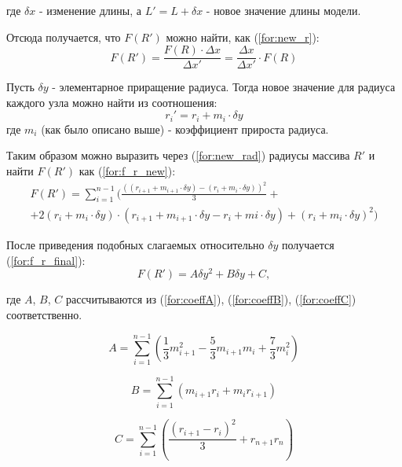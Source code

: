 где $\delta x$ - изменение длины, а $L' = L + \delta x$ - новое значение длины модели.

Отсюда получается, что $F(R')$ можно найти, как (\ref{for:new_r}):
\begin{equation}
    \label{for:new_r}
    F(R') = \frac{F(R) \cdot \Delta x}{\Delta x'} = \frac{\Delta x}{\Delta x'} \cdot F(R)
\end{equation}

Пусть $\delta y$ - элементарное приращение радиуса. Тогда новое значение для радиуса каждого узла можно найти из соотношения:
\begin{equation}
    \label{for:new_rad}
    r_i' = r_i + m_i \cdot \delta y
\end{equation}
где $m_i$ (как было описано выше) - коэффициент прироста радиуса.

Таким образом можно выразить через (\ref{for:new_rad}) радиусы массива $R'$ и найти $F(R')$ как (\ref{for:f_r_new}):
\begin{equation}
    \label{for:f_r_new}
    \begin{split}
        F(R') = \sum_{i=1}^{n-1} (\frac{((r_{i + 1} + m_{i + 1} \cdot \delta y) - (r_i + m_{i} \cdot \delta y))^2}{3} + \\
        + 2 (r_i + m_i \cdot \delta y) \cdot (r_{i + 1} + m_{i + 1} \cdot \delta y - r_i + m{i} \cdot \delta y) + (r_i + m_i \cdot \delta y)^2)
    \end{split}
\end{equation}

После приведения подобных слагаемых относительно $\delta y$ получается (\ref{for:f_r_final}):
\begin{equation}
    \label{for:f_r_final}
        F(R') = A \delta y^2 + B \delta y + C,
\end{equation}

где $A$, $B$, $C$ рассчитываются из (\ref{for:coeffA}), (\ref{for:coeffB}), (\ref{for:coeffC}) соответственно.

\begin{equation}
    \label{for:coeffA}
    A = \sum_{i=1}^{n-1}\left(\frac{1}{3}m_{i + 1}^2 - \frac{5}{3}m_{i + 1}m_i + \frac{7}{3}m_i^2 \right)
\end{equation}

\begin{equation}
    \label{for:coeffB}
    B = \sum_{i=1}^{n-1}\left(m_{i + 1}r_i + m_ir_{i + 1} \right)
\end{equation}

\begin{equation}
    \label{for:coeffC}
    C = \sum_{i=1}^{n-1}\left(\frac{(r_{i + 1} - r_i)^2}{3} + r_{n + 1}r_n\right)
\end{equation}

